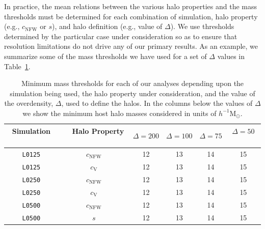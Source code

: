 \documentclass[usenatbib,usegraphicx,letterpaper]{mn2e}
\begin{document}
In practice, the mean relations between the various halo properties and the mass thresholds must be determined 
for each combination of simulation, halo property (e.g., $c_{\mathrm{NFW}}$ or $s$), and halo definition (e.g., value 
of $\Delta$). We use thresholds determined by the particular case under consideration so as to ensure that resolution 
limitations do not drive any of our primary results. As an example, we summarize some of the mass thresholds we have 
used for a set of $\Delta$ values in Table~\ref{table:thresholds}.

\begin{table}
\caption{
Minimum mass thresholds for each of our analyses depending upon the simulation being used, the halo property under consideration, and the 
value of the overdensity, $\Delta$, used to define the halos. In the columns below the values of $\Delta$ we show the minimum host halo masses 
considered in units of $h^{-1}\mathrm{M}_{\odot}$. }
\vspace*{8pt}
\begin{tabular}{ c c c c c c }
\hline
\hline
Simulation \ \ & \ \ Halo Property \ \  & $\Delta=200$ & $\Delta=100$ & $\Delta=75$ & $\Delta=50$ \ \\
\hline
{\tt L0125} & $c_{\mathrm{NFW}}$ & 12 & 13 & 14 & 15  \\
{\tt L0125} & $c_{\mathrm{V}}$ & 12 & 13 & 14 & 15 \\
\hline
{\tt L0250} & $c_{\mathrm{NFW}}$ & 12 & 13 & 14 & 15 \\
{\tt L0250} & $c_{\mathrm{V}}$ & 12 & 13 & 14 & 15 \\
\hline
{\tt L0500} & $c_{\mathrm{NFW}}$ & 12 & 13 & 14 & 15 \\
{\tt L0500} & $s$ & 12 & 13 & 14 & 15 \\
\hline
\hline
\end{tabular}
\label{table:thresholds}
\end{table}


\end{document}
